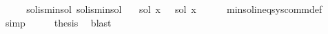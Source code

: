 \begin{isabellebody}
\ \ \isamarkupfalse%
\ \isamarkupfalse%
\ sol{}{\isacharunderscore}{\kern0pt}is{\isacharunderscore}{\kern0pt}min{\isacharunderscore}{\kern0pt}sol\ sol{}{\isacharunderscore}{\kern0pt}is{\isacharunderscore}{\kern0pt}min{\isacharunderscore}{\kern0pt}sol\ \isamarkupfalse%
\ {\isachardoublequoteopen}{\isasymPsi}\ {\isacharparenleft}{\kern0pt}sol{}\ x{\isacharparenright}{\kern0pt}\ {\isasymsubseteq}\ {\isasymPsi}\ {\isacharparenleft}{\kern0pt}sol{}\ x{\isacharparenright}{\kern0pt}{\isachardoublequoteclose}\isanewline
\ \ \ \ \isamarkupfalse%
\ min{\isacharunderscore}{\kern0pt}sol{\isacharunderscore}{\kern0pt}ineq{\isacharunderscore}{\kern0pt}sys{\isacharunderscore}{\kern0pt}comm{\isacharunderscore}{\kern0pt}def\ \isamarkupfalse%
\ simp\isanewline
\ \ \isamarkupfalse%
\ \isamarkupfalse%
\ {\isacharquery}{\kern0pt}thesis\ \isamarkupfalse%
\ blast\isanewline
{}\isamarkupfalse%
%
\endisatagproof
{\isafoldproof}%
%
\isadelimproof
\isanewline
%
\endisadelimproof
%
\isadelimtheory
\isanewline
%
\endisadelimtheory
%
\isatagtheory
{}\isamarkupfalse%
%
\endisatagtheory
{\isafoldtheory}%
%
\isadelimtheory
%
\endisadelimtheory
%
\end{isabellebody}%
\endinput

